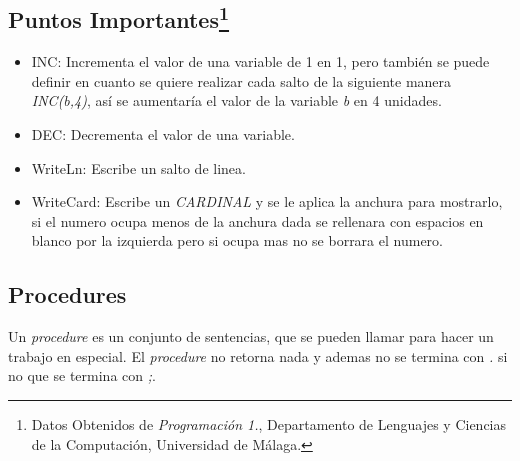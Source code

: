 \documentclass[10pt,journal,compsoc]{IEEEtran}
\begin{document}
\subsection{Puntos Importantes\protect\footnote{Datos Obtenidos de \emph{Programación 1.}, Departamento de Lenguajes y Ciencias de la Computación, Universidad de M\'alaga.}}
\begin{itemize}
	\item INC: Incrementa el valor de una variable de 1 en 1, pero tambi\'en se puede definir en cuanto se quiere realizar cada salto de la siguiente manera \emph{INC(b,4)}, as\'i se aumentar\'ia el valor de la variable \emph{b} en 4 unidades.
	\item DEC: Decrementa el valor de una variable.
	\item WriteLn: Escribe un salto de linea.
	\item WriteCard: Escribe un \emph{CARDINAL} y se le aplica la anchura para mostrarlo, si el numero ocupa menos de la anchura dada se rellenara con espacios en blanco por la izquierda pero si ocupa mas no se borrara el numero.
\end{itemize}

\subsection{Procedures}
Un \emph{procedure}  es un conjunto de sentencias, que se pueden llamar para hacer un trabajo en especial. El \emph{procedure}  no retorna nada y ademas no se termina con \emph{.} si no que se termina con \emph{;}.
\end{document}
